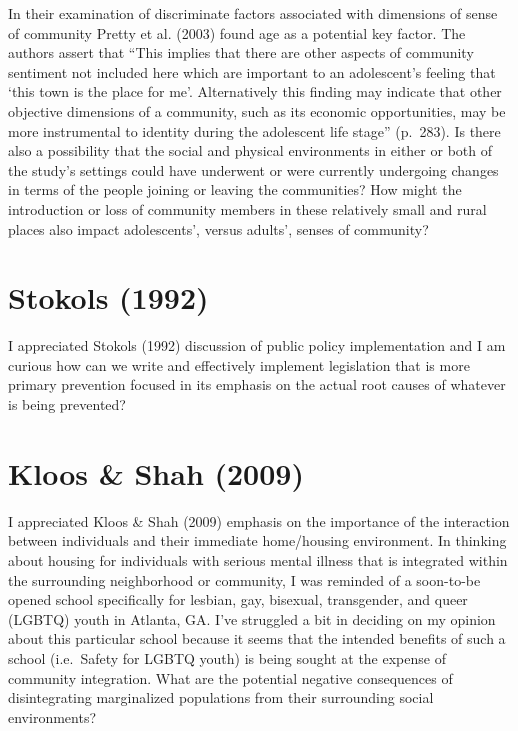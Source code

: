 \documentclass[11pt,]{tufte-handout}
\begin{document}
In their examination of discriminate factors associated with dimensions
of sense of community Pretty et al. (2003) found age as a potential key
factor. The authors assert that ``This implies that there are other
aspects of community sentiment not included here which are important to
an adolescent's feeling that `this town is the place for me'.
Alternatively this finding may indicate that other objective dimensions
of a community, such as its economic opportunities, may be more
instrumental to identity during the adolescent life stage'' (p.~283). Is
there also a possibility that the social and physical environments in
either or both of the study's settings could have underwent or were
currently undergoing changes in terms of the people joining or leaving
the communities? How might the introduction or loss of community members
in these relatively small and rural places also impact adolescents',
versus adults', senses of community?

\section{Stokols (1992)}\label{stokols1992establishing}

I appreciated Stokols (1992) discussion of public policy implementation
and I am curious how can we write and effectively implement legislation
that is more primary prevention focused in its emphasis on the actual
root causes of whatever is being prevented?

\section{Kloos \& Shah (2009)}\label{kloos2009social}

I appreciated Kloos \& Shah (2009) emphasis on the importance of the
interaction between individuals and their immediate home/housing
environment. In thinking about housing for individuals with serious
mental illness that is integrated within the surrounding neighborhood or
community, I was reminded of a soon-to-be opened school specifically for
lesbian, gay, bisexual, transgender, and queer (LGBTQ) youth in Atlanta,
GA. I've struggled a bit in deciding on my opinion about this particular
school because it seems that the intended benefits of such a school
(i.e.~Safety for LGBTQ youth) is being sought at the expense of
community integration. What are the potential negative consequences of
disintegrating marginalized populations from their surrounding social
environments?
\end{document}
